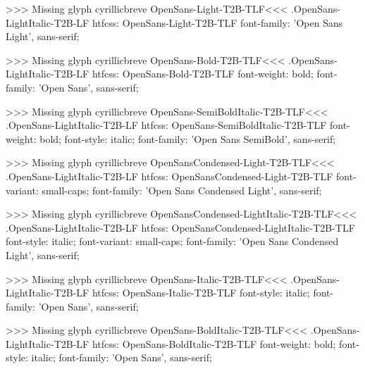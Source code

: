 >>>
Missing glyph	cyrillicbreve
\<OpenSans-Light-T2B-TLF\><<<
.OpenSans-LightItalic-T2B-LF
htfcss:  OpenSans-Light-T2B-TLF  font-family: 'Open Sans Light', sans-serif;

>>>
Missing glyph	cyrillicbreve
\<OpenSans-Bold-T2B-TLF\><<<
.OpenSans-LightItalic-T2B-LF
htfcss:  OpenSans-Bold-T2B-TLF  font-weight: bold; font-family: 'Open Sans', sans-serif;

>>>
Missing glyph	cyrillicbreve
\<OpenSans-SemiBoldItalic-T2B-TLF\><<<
.OpenSans-LightItalic-T2B-LF
htfcss:  OpenSans-SemiBoldItalic-T2B-TLF  font-weight: bold; font-style: italic; font-family: 'Open Sans SemiBold', sans-serif;

>>>
Missing glyph	cyrillicbreve
\<OpenSansCondensed-Light-T2B-TLF\><<<
.OpenSans-LightItalic-T2B-LF
htfcss:  OpenSansCondensed-Light-T2B-TLF  font-variant: small-caps; font-family: 'Open Sans Condensed Light', sans-serif;

>>>
Missing glyph	cyrillicbreve
\<OpenSansCondensed-LightItalic-T2B-TLF\><<<
.OpenSans-LightItalic-T2B-LF
htfcss:  OpenSansCondensed-LightItalic-T2B-TLF  font-style: italic; font-variant: small-caps; font-family: 'Open Sans Condensed Light', sans-serif;

>>>
Missing glyph	cyrillicbreve
\<OpenSans-Italic-T2B-TLF\><<<
.OpenSans-LightItalic-T2B-LF
htfcss:  OpenSans-Italic-T2B-TLF  font-style: italic; font-family: 'Open Sans', sans-serif;

>>>
Missing glyph	cyrillicbreve
\<OpenSans-BoldItalic-T2B-TLF\><<<
.OpenSans-LightItalic-T2B-LF
htfcss:  OpenSans-BoldItalic-T2B-TLF  font-weight: bold; font-style: italic; font-family: 'Open Sans', sans-serif;


